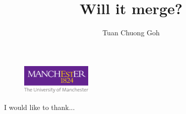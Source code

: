 \documentclass[12pt,BSc,wordcount, oneside]{muthesis}
\begin{document}
\begin{figure}
  \centering
  \includegraphics[width=0.3\textwidth]{uom_logo.pdf}
  \label{fig:uom_logo}
\end{figure} 

\title{Will it merge?}
\author{Tuan Chuong Goh}

\beforeabstract



\afterabstract

I would like to thank...

\afterpreface




% 







\appendix

\end{document}
